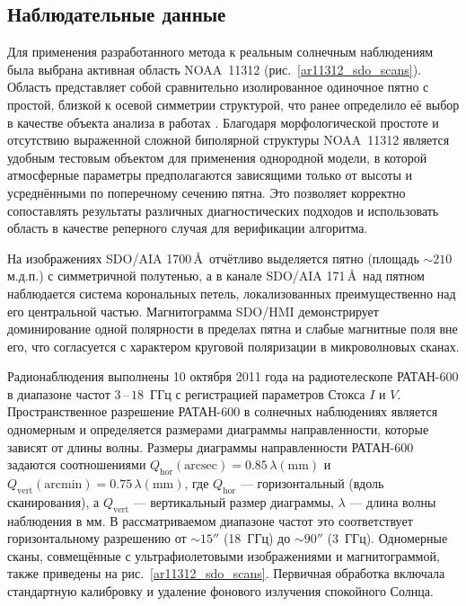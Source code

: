 \documentclass[
 aps, pra,
 amsmath,amssymb,
 11pt,
 final,
tightenlines,
 twoside,
 twocolumn,
 nofloats,
nofootinbib,
 superscriptaddress,
showkeys,
showkeywords,
 ]
{revtex4-2}
\begin{document}
\subsection{Наблюдательные данные}

Для применения разработанного метода к реальным солнечным наблюдениям
была выбрана активная область NOAA~11312
(рис.~\ref{ar11312_sdo_scans}).
Область представляет собой сравнительно изолированное одиночное пятно
с простой, близкой к осевой симметрии структурой, что ранее определило
её выбор в качестве объекта анализа в работах
\cite{Stupishin2018,Alissandrakis2019}.
Благодаря морфологической простоте и отсутствию выраженной сложной
биполярной структуры NOAA~11312 является удобным тестовым объектом
для применения однородной модели, в которой атмосферные параметры
предполагаются зависящими только от высоты и усреднёнными по
поперечному сечению пятна. Это позволяет корректно сопоставлять
результаты различных диагностических подходов и использовать область
в качестве реперного случая для верификации алгоритма.

На изображениях SDO/AIA 1700\,\AA\ отчётливо выделяется  пятно (площадь $\sim 210$~ м.д.п.)
с симметричной полутенью, а в канале SDO/AIA 171\,\AA\ над пятном наблюдается
система корональных петель, локализованных преимущественно над его
центральной частью. Магнитограмма SDO/HMI демонстрирует доминирование
одной полярности в пределах пятна и слабые магнитные поля вне его,
что согласуется с характером круговой поляризации в микроволновых сканах.

Радионаблюдения выполнены 10 октября 2011 года на радиотелескопе
РАТАН-600 в диапазоне частот $3$\,--\,$18$~ГГц с  регистрацией параметров Стокса $I$ и $V$.
Пространственное разрешение РАТАН-600 в солнечных наблюдениях
является одномерным и определяется размерами диаграммы направленности,
которые зависят от длины волны. Размеры диаграммы направленности РАТАН-600 задаются соотношениями
$Q_{\mathrm{hor}}(\mathrm{arcsec}) = 0.85\,\lambda(\mathrm{mm})$
и
$Q_{\mathrm{vert}}(\mathrm{arcmin}) = 0.75\,\lambda(\mathrm{mm})$,
где $Q_{\mathrm{hor}}$ --- горизонтальный (вдоль сканирования),
а $Q_{\mathrm{vert}}$ --- вертикальный размер диаграммы,  $\lambda$ --- длина волны наблюдения в мм.  В рассматриваемом диапазоне частот это соответствует
горизонтальному разрешению от $\sim 15''$ (18~ГГц)
до $\sim 90''$ (3~ГГц). Одномерные сканы, совмещённые с ультрафиолетовыми изображениями
и магнитограммой, также приведены на рис.~\ref{ar11312_sdo_scans}.
Первичная обработка включала стандартную калибровку
и удаление фонового излучения спокойного Солнца.
\end{document}
